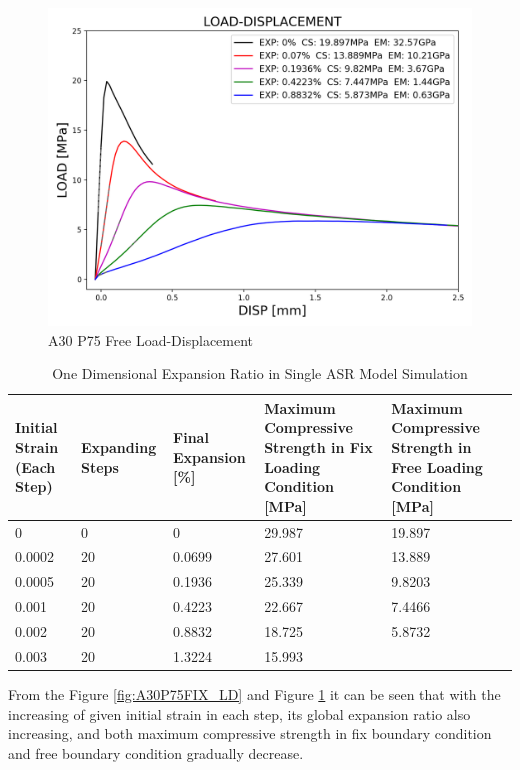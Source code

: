 \begin{figure}[ht!]
\centering
\includegraphics[width=.8\linewidth]{Files/exp_3D/ASR/S13A30P75FREE-LOAD-DISPLACEMENT.png}
  \caption{A30 P75 Free Load-Displacement}
  \label{fig:A30P75FREE_LD}
\end{figure}

\begin{table}[ht!]
\centering
\begin{tabular}{ ||p{2cm}|p{2cm}|p{2cm}|p{3cm}|p{3cm}|| }
 \hline
  Initial Strain (Each Step) & Expanding Steps & Final Expansion [\%] & Maximum Compressive Strength in Fix Loading Condition [MPa] & Maximum Compressive Strength in Free Loading Condition [MPa]\\ [0.5ex]
 \hline\hline
  0 & 0 & 0 & 29.987 & 19.897\\
  0.0002 & 20 & 0.0699 & 27.601 & 13.889\\
  0.0005 & 20 & 0.1936 & 25.339 & 9.8203\\
  0.001 & 20 & 0.4223 & 22.667 & 7.4466\\
  0.002 & 20 & 0.8832 & 18.725 & 5.8732 \\
  0.003 & 20 & 1.3224 & 15.993 &\\

 \hline
\end{tabular}
\caption{One Dimensional Expansion Ratio in Single ASR Model Simulation}
\label{table:ASR_30_EXP}
\end{table}

From the Figure \ref{fig:A30P75FIX_LD} and Figure \ref{fig:A30P75FREE_LD} it can be seen that with the increasing of given initial strain in each step, its global expansion ratio also increasing, and both maximum compressive strength in fix boundary condition and free boundary condition gradually decrease.




